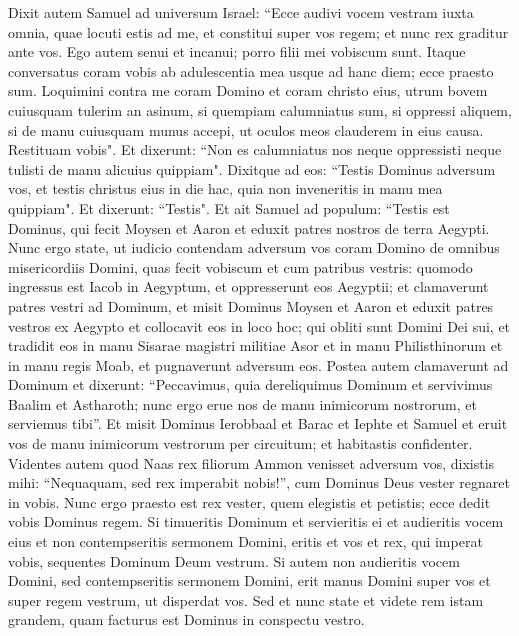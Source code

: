 \begin{biblechapter}  
\verse Dixit autem Samuel ad universum Israel: “Ecce audivi vocem vestram iuxta omnia, quae locuti estis ad me, et constitui super vos regem; 
\verse et nunc rex graditur ante vos. Ego autem senui et incanui; porro filii mei vobiscum sunt. Itaque conversatus coram vobis ab adulescentia mea usque ad hanc diem; 
\verse ecce praesto sum. Loquimini contra me coram Domino et coram christo eius, utrum bovem cuiusquam tulerim an asinum, si quempiam calumniatus sum, si oppressi aliquem, si de manu cuiusquam munus accepi, ut oculos meos clauderem in eius causa. Restituam vobis". 
\verse Et dixerunt: “Non es calumniatus nos neque oppressisti neque tulisti de manu alicuius quippiam". 
\verse Dixitque ad eos: “Testis Dominus adversum vos, et testis christus eius in die hac, quia non inveneritis in manu mea quippiam". Et dixerunt: “Testis". 
\verse Et ait Samuel ad populum: “Testis est Dominus, qui fecit Moysen et Aaron et eduxit patres nostros de terra Aegypti. 
\verse Nunc ergo state, ut iudicio contendam adversum vos coram Domino de omnibus misericordiis Domini, quas fecit vobiscum et cum patribus vestris: 
\verse quomodo ingressus est Iacob in Aegyptum, et oppresserunt eos Aegyptii; et clamaverunt patres vestri ad Dominum, et misit Dominus Moysen et Aaron et eduxit patres vestros ex Aegypto et collocavit eos in loco hoc; 
\verse qui obliti sunt Domini Dei sui, et tradidit eos in manu Sisarae magistri militiae Asor et in manu Philisthinorum et in manu regis Moab, et pugnaverunt adversum eos. 
\verse Postea autem clamaverunt ad Dominum et dixerunt: “Peccavimus, quia dereliquimus Dominum et servivimus Baalim et Astharoth; nunc ergo erue nos de manu inimicorum nostrorum, et serviemus tibi”. 
\verse Et misit Dominus Ierobbaal et Barac et Iephte et Samuel et eruit vos de manu inimicorum vestrorum per circuitum; et habitastis confidenter. 
\verse Videntes autem quod Naas rex filiorum Ammon venisset adversum vos, dixistis mihi: “Nequaquam, sed rex imperabit nobis!”, cum Dominus Deus vester regnaret in vobis. 
\verse Nunc ergo praesto est rex vester, quem elegistis et petistis; ecce dedit vobis Dominus regem. 
\verse Si timueritis Dominum et servieritis ei et audieritis vocem eius et non contempseritis sermonem Domini, eritis et vos et rex, qui imperat vobis, sequentes Dominum Deum vestrum. 
\verse Si autem non audieritis vocem Domini, sed contempseritis sermonem Domini, erit manus Domini super vos et super regem vestrum, ut disperdat vos. 
\verse Sed et nunc state et videte rem istam grandem, quam facturus est Dominus in conspectu vestro. 

\end{biblechapter}

